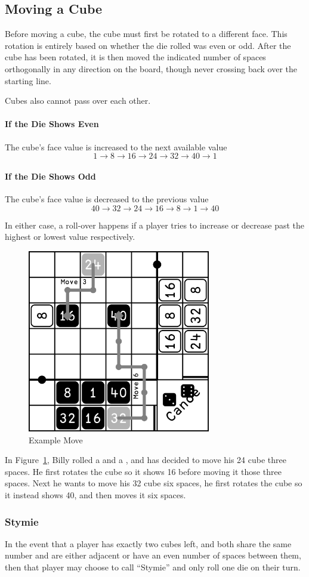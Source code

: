 \subsection{Moving a Cube}
Before moving a cube, the cube must first be rotated to a different face.
This rotation is entirely based on whether the die rolled was even or odd.
After the cube has been rotated, it is then moved the indicated number of spaces orthogonally in any direction on the board, though never crossing back over the starting line.

Cubes also cannot pass over each other.

\paragraph{If the Die Shows Even} The cube's face value is increased to the next available value
$$1 \to 8 \to 16 \to 24 \to 32 \to 40 \to 1$$
\paragraph{If the Die Shows Odd} The cube's face value is decreased to the previous value
$$40 \to 32 \to 24 \to 16 \to 8 \to 1 \to 40$$

\note In either case, a roll-over happens if a player tries to increase or decrease past the highest or lowest value respectively.

\begin{figure}[!h]
    \centering
    \includegraphics[width=8cm]{../graphics/movement}
    \caption{Example Move}
    \label{fig:move}
\end{figure}

\example In Figure~\ref{fig:move}, Billy rolled a  and a , and has decided to move his 24 cube three spaces. 
He first rotates the cube so it shows 16 before moving it those three spaces. 
Next he wants to move his 32 cube six spaces, he first rotates the cube so it instead shows 40, and then moves it six spaces.

\subsubsection{Stymie}
In the event that a player has exactly two cubes left, and both share the same number and are either adjacent or have an even number of spaces between them, then that player may choose to call ``Stymie'' and only roll one die on their turn.